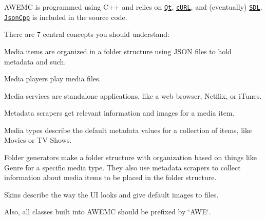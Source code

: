 A\-W\-E\-M\-C is programmed using C++ and relies on \href{http://www.qt-project.org/}{\tt Qt}, \href{http://curl.haxx.se/}{\tt c\-U\-R\-L}, and (eventually) \href{http://libsdl.org/}{\tt S\-D\-L}. \href{http://jsoncpp.sourceforge.net}{\tt Json\-Cpp} is included in the source code.

There are 7 central concepts you should understand\-:


\begin{DoxyItemize}
\item Media items are organized in a folder structure using J\-S\-O\-N files to hold metadata and such.
\item Media players play media files.
\item Media services are standalone applications, like a web browser, Netflix, or i\-Tunes.
\item Metadata scrapers get relevant information and images for a media item.
\item Media types describe the default metadata values for a collection of items, like Movies or T\-V Shows.
\item Folder generators make a folder structure with organization based on things like Genre for a specific media type. They also use metadata scrapers to collect information about media items to be placed in the folder structure.
\item Skins describe the way the U\-I looks and give default images to files.
\end{DoxyItemize}

Also, all classes built into A\-W\-E\-M\-C should be prefixed by \char`\"{}\-A\-W\-E\char`\"{}. 